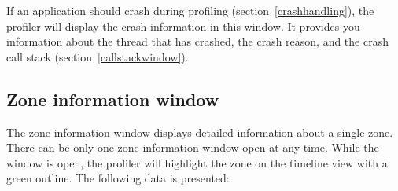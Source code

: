 \documentclass[hidelinks,titlepage,a4paper,twoside]{article}
\begin{document}
If an application should crash during profiling (section~\ref{crashhandling}), the profiler will display the crash information in this window. It provides you information about the thread that has crashed, the crash reason, and the crash call stack (section~\ref{callstackwindow}).

\subsection{Zone information window}
\label{zoneinfo}

The zone information window displays detailed information about a single zone. There can be only one zone information window open at any time. While the window is open, the profiler will highlight the zone on the timeline view with a green outline. The following data is presented:
\end{document}
